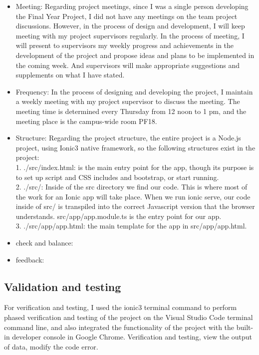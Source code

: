\begin{itemize}
\item Meeting:  Regarding project meetings, since I was a single person developing the Final Year Project, I did not have any meetings on the team project discussions. However, in the process of design and development, I will keep meeting with my project supervisors regularly. In the process of meeting, I will present to supervisors my weekly progress and achievements in the development of the project and propose ideas and plans to be implemented in the coming week. And supervisors will make appropriate suggestions and supplements on what I have stated.

\item Frequency:  In the process of designing and developing the project, I maintain a weekly meeting with my project supervisor to discuss the meeting. The meeting time is determined every Thursday from 12 noon to 1 pm, and the meeting place is the campus-wide room PF18.
\item Structure: Regarding the project structure, the entire project is a Node.js project, using Ionic3 native framework, so the following structures exist in the project: \\ 1. ./src/index.html: is the main entry point for the app, though its purpose is to set up script and CSS includes and bootstrap, or start running. \\ 2. ./src/: Inside of the src directory we find our code. This is where most of the work for an Ionic app will take place. When we run ionic serve, our code inside of src/ is transpiled into the correct Javascript version that the browser understands. src/app/app.module.ts is the entry point for our app. \\ 3. ./src/app/app.html:  the main template for the app in src/app/app.html.
\item check and balance:
\item feedback:
\end{itemize}

\subsection{Validation and testing}
For verification and testing, I used the ionic3 terminal command to perform phased verification and testing of the project on the Visual Studio Code terminal command line, and also integrated the functionality of the project with the built-in developer console in Google Chrome. Verification and testing, view the output of data, modify the code error.
